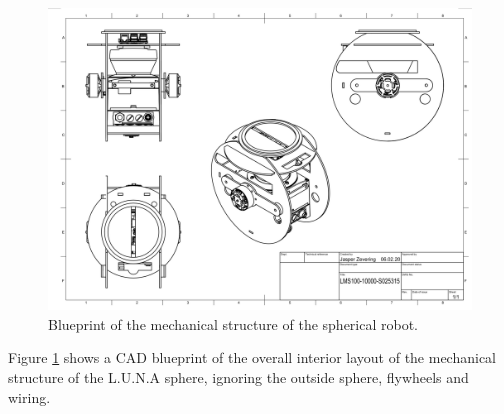 \begin{figure}                                                                                                                                                                                                    
\centering                                                                                                                                                                                                        
\includegraphics[width=\textwidth]{../Media/BlueprintPNG.png}                                                                                                                                                      
\caption{Blueprint of the mechanical structure of the spherical robot.}                                                                                                                                   
\label{sec:TechnicalApproach:fig:blueprint}                                                                                                                                                                       
\end{figure}                                                                                                                                                                                                      
Figure \ref{sec:TechnicalApproach:fig:blueprint} shows a CAD blueprint of the overall interior layout of the mechanical structure of the L.U.N.A sphere, ignoring the outside sphere, flywheels and wiring.
